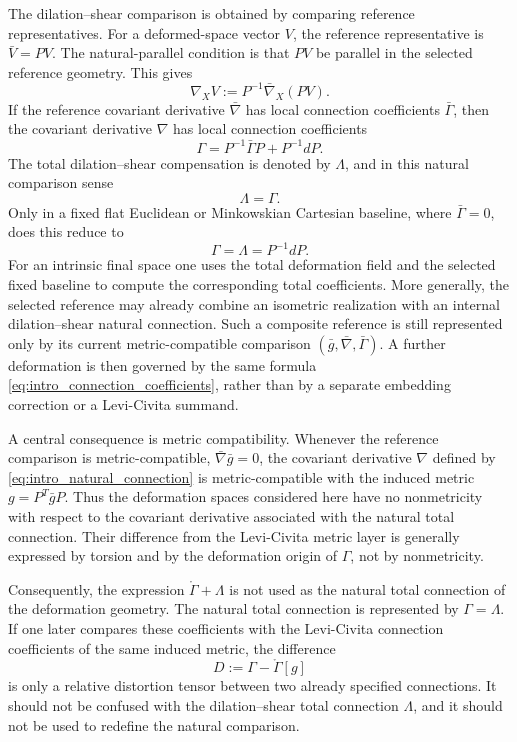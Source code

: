 \documentclass[12pt]{amsart}
\theoremstyle{definition}
\theoremstyle{remark}
\begin{document}
The dilation--shear comparison is obtained by comparing reference representatives.  For a deformed-space vector \(V\), the reference representative is \(\bar V=PV\).  The natural-parallel condition is that \(PV\) be parallel in the selected reference geometry.  This gives
\begin{equation}\label{eq:intro_natural_connection}
 \nabla_XV:=P^{-1}\bar\nabla_X(PV).
\end{equation}
If the reference covariant derivative \(\bar\nabla\) has local connection coefficients \(\bar\Gamma\), then the covariant derivative \(\nabla\) has local connection coefficients
\begin{equation}\label{eq:intro_connection_coefficients}
 \Gamma=P^{-1}\bar\Gamma P+P^{-1}dP.
\end{equation}
The total dilation--shear compensation is denoted by \(\Lambda\), and in this natural comparison sense
\begin{equation}\label{eq:intro_Lambda_equals_Gamma}
 \Lambda=\Gamma.
\end{equation}
Only in a fixed flat Euclidean or Minkowskian Cartesian baseline, where \(\bar\Gamma=0\), does this reduce to
\[
 \Gamma=\Lambda=P^{-1}dP .
\]
For an intrinsic final space one uses the total deformation field and the selected fixed baseline to compute the corresponding total coefficients.  More generally, the selected reference may already combine an isometric realization with an internal dilation--shear natural connection.  Such a composite reference is still represented only by its current metric-compatible comparison \((\bar g,\bar\nabla,\bar\Gamma)\).  A further deformation is then governed by the same formula \eqref{eq:intro_connection_coefficients}, rather than by a separate embedding correction or a Levi-Civita summand.

A central consequence is metric compatibility.  Whenever the reference comparison is metric-compatible, \(\bar\nabla\bar g=0\), the covariant derivative \(\nabla\) defined by \eqref{eq:intro_natural_connection} is metric-compatible with the induced metric \(g=P^T\bar gP\).  Thus the deformation spaces considered here have no nonmetricity with respect to the covariant derivative associated with the natural total connection.  Their difference from the Levi-Civita metric layer is generally expressed by torsion and by the deformation origin of \(\Gamma\), not by nonmetricity.

Consequently, the expression \(\mathring\Gamma+\Lambda\) is not used as the natural total connection of the deformation geometry.  The natural total connection is represented by \(\Gamma=\Lambda\).  If one later compares these coefficients with the Levi-Civita connection coefficients of the same induced metric, the difference
\[
 D:=\Gamma-\mathring\Gamma[g]
\]
is only a relative distortion tensor between two already specified connections.  It should not be confused with the dilation--shear total connection \(\Lambda\), and it should not be used to redefine the natural comparison.
\end{document}
